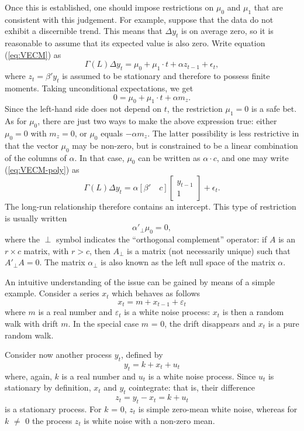 Once this is established, one should impose restrictions on $\mu_0$
and $\mu_1$ that are consistent with this judgement. For example,
suppose that the data do not exhibit a discernible trend. This means
that $\Delta y_t$ is on average zero, so it is reasonable to assume
that its expected value is also zero. Write equation (\ref{eq:VECM})
as
\begin{equation}
  \label{eq:VECM-poly}
  \Gamma(L) \Delta y_t = \mu_0 + \mu_1 \cdot t + \alpha z_{t-1} +
  \epsilon_t ,
\end{equation}
where $z_{t} = \beta' y_{t}$ is assumed to be stationary and therefore
to possess finite moments. Taking unconditional expectations, we get
\[ 
  0 = \mu_0 + \mu_1 \cdot t + \alpha m_z .
\]
Since the left-hand side does not depend on $t$, the restriction
$\mu_1 = 0$ is a safe bet.  As for $\mu_0$, there are just two ways to
make the above expression true: either $\mu_0 = 0$ with $m_z = 0$, or
$\mu_0$ equals $-\alpha m_z$.  The latter possibility is less
restrictive in that the vector $\mu_0$ may be non-zero, but is
constrained to be a linear combination of the columns of $\alpha$.  In
that case, $\mu_0$ can be written as $\alpha \cdot c$, and one may
write (\ref{eq:VECM-poly}) as
\[
  \Gamma(L) \Delta y_t = \alpha \left[ \beta' \quad c \right] 
  \left[ \begin{array}{c} y_{t-1} \\ 1 \end{array} \right]  
  + \epsilon_t .
\]
The long-run relationship therefore contains an intercept. This type of
restriction is usually written
\[
  \alpha'_{\perp} \mu_0 = 0 ,
\]
where the $\perp$ symbol indicates the ``orthogonal complement''
operator: if $A$ is an $r \times c$ matrix, with $r>c$, then
$A_{\perp}$ is a matrix (not necessarily unique) such that
$A'_{\perp}A = 0$. The matrix $\alpha_{\perp}$ is also known as the
left null space of the matrix $\alpha$.

An intuitive understanding of the issue can be gained by means of a
simple example. Consider a series $x_t$ which behaves as follows
%      
\[ x_t = m + x_{t-1} + \varepsilon_t \] 
%
where $m$ is a real number and $\varepsilon_t$ is a white noise
process: $x_t$ is then a random walk with drift $m$.  In the special
case $m$ = 0, the drift disappears and $x_t$ is a pure random walk.
    
Consider now another process $y_t$, defined by
%      
\[ y_t = k + x_t + u_t \] 
%
where, again, $k$ is a real number and $u_t$ is a white noise process.
Since $u_t$ is stationary by definition, $x_t$ and $y_t$ cointegrate:
that is, their difference
%      
\[ z_t = y_t - x_t = k + u_t \]
%	
is a stationary process. For $k$ = 0, $z_t$ is simple zero-mean white
noise, whereas for $k$ $\ne$ 0 the process $z_t$ is white noise with a
non-zero mean.
  

